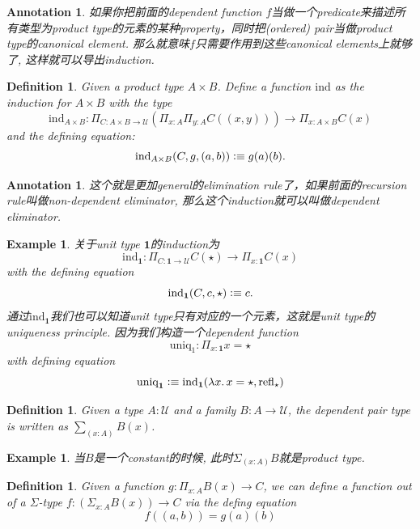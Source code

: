 \documentclass{article}
\newtheorem{example}[theorem]{Example}
\newtheorem{definition}[theorem]{Definition}
\newtheorem{annotation}[theorem]{Annotation}
\newcommand{\lam}[2]{\ensuremath{\lambda #1\ldotp #2}} %
\newcommand{\defeqv}{\vcentcolon\equiv}
\begin{document}
\begin{annotation}
\rm 如果你把前面的dependent function $f$当做一个predicate来描述所有类型为product type的元素的某种property，同时把(ordered) pair当做product type的canonical element. 那么就意味$f$只需要作用到这些canonical elements上就够了, 这样就可以导出induction.
\end{annotation}

\begin{definition}
\rm Given a product type $A \times B$. Define a function $\text{ind}$ as the induction for $A \times B$ with the type
\[
	\text{ind}_{A \times B}: {\Pi}_{C:A \times B \to \mathcal{U}}(\Pi_{x:A}\Pi_{y:A} C((x,y))) \to \Pi_{x:A\times B} C(x)
\]
and the defining equation:
\[
	\text{ind}_{A \times B}(C, g, (a,b)) \defeqv g(a)(b).
\]
\end{definition}

\begin{annotation}
\rm 这个就是更加general的elimination rule了，如果前面的recursion rule叫做non-dependent eliminator, 那么这个induction就可以叫做dependent eliminator.
\end{annotation}

\begin{example}
\rm 关于unit type $\mathbf{1}$的induction为
\[
    \text{ind}_\mathbf{1}: \Pi_{C:\mathbf{1} \to \mathcal{U}} C(\star) \to \Pi_{x:\mathbf{1}} C(x)
\]
with the defining equation
\[
    \text{ind}_\mathbf{1}(C,c,\star) \defeqv c.
\]
通过$\text{ind}_\mathbf{1}$我们也可以知道unit type只有对应的一个元素，这就是unit type的uniqueness principle. 因为我们构造一个dependent function
\[
    \text{uniq}_1:\Pi_{x:\mathbf{1}} x=\star
\]
with defining equation
\[
    \text{uniq}_\mathbf{1} \defeqv \text{ind}_\mathbf{1}(\lam{x}{x = \star}, \text{refl}_\star)
\]
\end{example}

\begin{definition}
\rm Given a type $A:\mathcal{U}$ and a family $B: A \to \mathcal{U}$, the dependent pair type is written as $\sum_{(x:A)} B(x)$.
\end{definition}

\begin{example}
\rm 当$B$是一个constant的时候, 此时$\Sigma_{(x:A)} B$就是product type.
\end{example}

\begin{definition}
\rm Given a function $g:\Pi_{x:A} B(x) \to C$, we can define a function out of a $\Sigma$-type $f:(\Sigma_{x:A}B(x)) \to C$ via the defing equation
\[
    f((a,b)) = g(a)(b)
\]
\end{definition}
\end{document}
